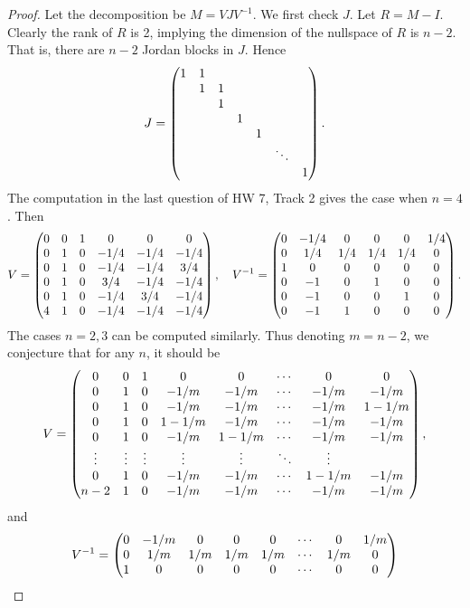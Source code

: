 \documentclass[12pt]{article}
\theoremstyle{plain}
\begin{document}
\begin{proof}
Let the decomposition be $M = VJV^{-1}$. We first check $J$. Let $R = M - I$. Clearly the rank of $R$ is 2, implying the dimension of the nullspace of $R$ is $n-2$. That is, there are $n-2$ Jordan blocks in $J$. Hence
$$J = \begin{pmatrix}
1&1& & & & & \\
 &1&1& & & & \\
 & &1& & & & \\
 & & &1& & & \\
 & & & &1 & & \\
 & & & & &\ddots & \\
 & & & & & &1 \\
\end{pmatrix}.$$
The computation in the last question of HW 7, Track 2 gives the case when $n=4$. Then
$$V = \begin{pmatrix}
0&0&1&0&0&0\\
0&1&0&-1/4&-1/4&-1/4\\
0&1&0&-1/4&-1/4&3/4\\
0&1&0&3/4&-1/4&-1/4\\
0&1&0&-1/4&3/4&-1/4\\
4&1&0&-1/4&-1/4&-1/4\\
\end{pmatrix},\quad
V^{-1} = \begin{pmatrix}
0&-1/4&0&0&0&1/4\\
0&1/4&1/4&1/4&1/4&0\\
1&0&0&0&0&0\\
0&-1&0&1&0&0\\
0&-1&0&0&1&0\\
0&-1&1&0&0&0\\
\end{pmatrix}.$$
The cases $n=2, 3$ can be computed similarly. Thus denoting $m=n-2$, we conjecture that for any $n$, it should be
$$V=\begin{pmatrix}
0 & 0 & 1 & 0 & 0 & \cdots & 0 & 0 \\
0 & 1 & 0 & -1/m & -1/m & \cdots & -1/m & -1/m \\
0 & 1 & 0 & -1/m & -1/m & \cdots & -1/m & 1-1/m \\
0 & 1 & 0 & 1-1/m & -1/m & \cdots & -1/m & -1/m \\
0 & 1 & 0 & -1/m & 1-1/m & \cdots & -1/m & -1/m \\
\vdots & \vdots & \vdots & \vdots & \vdots & \ddots & \vdots \\
0 & 1 & 0 & -1/m & -1/m & \cdots & 1-1/m & -1/m \\
n-2 & 1 & 0 & -1/m & -1/m & \cdots & -1/m & -1/m \\
\end{pmatrix},$$
and
$$V^{-1}=\begin{pmatrix}
0 & -1/m & 0 & 0 & 0 & \cdots & 0 & 1/m \\
0 & 1/m & 1/m & 1/m & 1/m & \cdots & 1/m & 0 \\
1 & 0 & 0 & 0 & 0 & \cdots & 0 & 0 \\
\end{pmatrix}$$
\end{proof}
\end{document}
